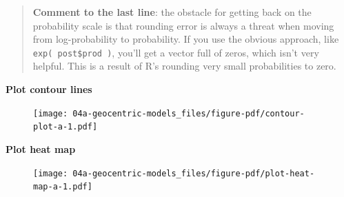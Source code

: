 \documentclass[
  letterpaper,
  DIV=11,
  numbers=noendperiod]{scrreprt}
\newenvironment{Shaded}{\begin{snugshade}}{\end{snugshade}}
\newcommand{\CommentTok}[1]{\textcolor[rgb]{0.37,0.37,0.37}{#1}}
\newcommand{\DocumentationTok}[1]{\textcolor[rgb]{0.37,0.37,0.37}{\textit{#1}}}
\newcommand{\FunctionTok}[1]{\textcolor[rgb]{0.28,0.35,0.67}{#1}}
\newcommand{\InformationTok}[1]{\textcolor[rgb]{0.37,0.37,0.37}{#1}}
\newcommand{\NormalTok}[1]{\textcolor[rgb]{0.00,0.23,0.31}{#1}}
\newcommand{\SpecialCharTok}[1]{\textcolor[rgb]{0.37,0.37,0.37}{#1}}
\begin{document}
\begin{quote}
\textbf{Comment to the last line}: the obstacle for getting back on the
probability scale is that rounding error is always a threat when moving
from log-probability to probability. If you use the obvious approach,
like \texttt{exp(\ post\$prod\ )}, you'll get a vector full of zeros,
which isn't very helpful. This is a result of R's rounding very small
probabilities to zero.
\end{quote}

\textbf{Plot contour lines}

\begin{Shaded}
\end{Shaded}

\begin{figure}[H]

{\centering \texttt{[image: 04a-geocentric-models\_files/figure-pdf/contour-plot-a-1.pdf]}

}

\end{figure}

\textbf{Plot heat map}

\begin{Shaded}
\end{Shaded}

\begin{figure}[H]

{\centering \texttt{[image: 04a-geocentric-models\_files/figure-pdf/plot-heat-map-a-1.pdf]}

}

\end{figure}
\end{document}
